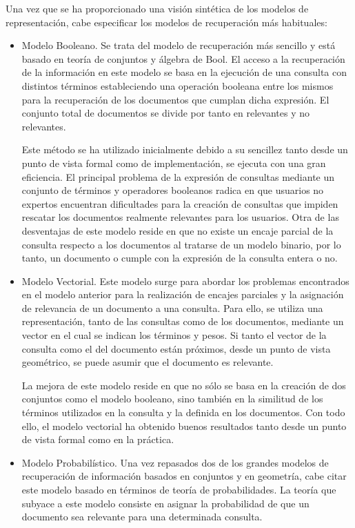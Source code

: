 Una vez que se ha proporcionado una visión sintética de los modelos 
de representación, cabe especificar los modelos de recuperación más 
habituales:

\begin{itemize}
 \item Modelo Booleano. Se trata del modelo de recuperación más sencillo y está basado 
en teoría de conjuntos y álgebra de Bool. El acceso a la recuperación de la información 
en este modelo se basa en la ejecución de una consulta con distintos términos estableciendo 
una operación booleana entre los mismos para la recuperación de los documentos que cumplan 
dicha expresión. El conjunto total de documentos se divide por tanto en relevantes y 
no relevantes. 

Este método se ha utilizado inicialmente debido a su sencillez tanto desde un punto 
de vista formal como de implementación, se ejecuta con una gran eficiencia. El principal 
problema de la expresión de consultas mediante un conjunto de términos y operadores booleanos 
radica en que usuarios no expertos encuentran dificultades para la creación de consultas que impiden rescatar los documentos realmente relevantes para los usuarios. Otra 
de las desventajas de este modelo reside en que no existe un encaje parcial de la consulta 
respecto a los documentos al tratarse de un modelo binario, por lo tanto, un documento 
o cumple con la expresión de la consulta entera o no.
 
\item Modelo Vectorial. Este modelo surge para abordar los problemas encontrados en el modelo 
anterior para la realización de encajes parciales y la asignación de relevancia de un documento 
a una consulta. Para ello, se utiliza una representación, tanto de las consultas como de los 
documentos, mediante un vector en el cual se indican los términos y pesos. Si tanto 
el vector de la consulta como el del documento están próximos, desde un punto de 
vista geométrico, se puede asumir que el documento es relevante.

La mejora de este modelo reside en que no sólo se basa en la creación de dos conjuntos 
como el modelo booleano, sino también en la similitud de los términos utilizados 
en la consulta y la definida en los documentos. Con todo ello, el modelo vectorial 
ha obtenido buenos resultados tanto desde un punto de vista formal como en la práctica.
 
\item Modelo Probabilístico. Una vez repasados dos de los grandes modelos de recuperación 
de información basados en conjuntos y en geometría, cabe citar este modelo basado en términos 
de teoría de probabilidades. La teoría que subyace a este modelo consiste en asignar la probabilidad 
de que un documento sea relevante para una determinada consulta.
\end{itemize}


